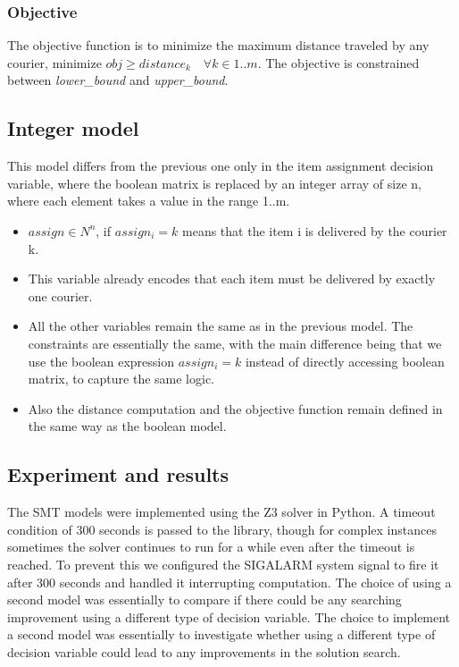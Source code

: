 \documentclass{article}
\begin{document}
\subsubsection{Objective}
The objective function is to minimize the maximum distance traveled by any courier, minimize $obj \geq distance_k \quad \forall k \in 1..m$. The objective is constrained between \textit{lower\_bound} and \textit{upper\_bound}.

\subsection{Integer model}
This model differs from the previous one only in the item assignment decision variable, where the boolean matrix is replaced by an integer array of size n, where each element takes a value in the range 1..m. 
\begin{itemize}
    \item 
    $assign \in N^{n}$, if $assign_i = k$ means that the item i is delivered by the courier k.
    \item 
    This variable already encodes that each item must be delivered by exactly one courier.
    \item
    All the other variables remain the same as in the previous model. The constraints are essentially the same, with the main difference being that we use the boolean expression $assign_i =k$ instead of directly accessing boolean matrix, to capture the same logic.
    \item 
    Also the distance computation and the objective function remain defined in the same way as the boolean model.
\end{itemize}
\subsection{Experiment and results}
The SMT models were implemented using the Z3 solver in Python. A timeout condition of 300 seconds is passed to the library, though for complex instances sometimes the solver continues to run for a while even after the timeout is reached. To prevent this we configured the SIGALARM system signal to fire it after 300 seconds and handled it interrupting computation.
The choice of using a second model was essentially to compare if there could be any searching improvement using a different type of decision variable.
The choice to implement a second model was essentially to investigate whether using a different type of decision variable could lead to any improvements in the solution search.
\end{document}
